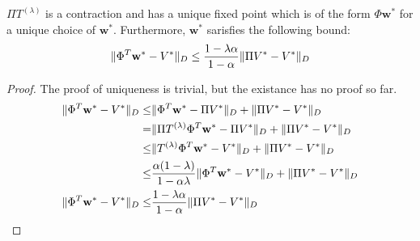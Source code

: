 \begin{lem}
    $ \Pi T^{(\lambda)} $ is a contraction and has a unique fixed point which is of the form $ \Phi \mathbf{w}^* $ 
    for a unique choice of $ \mathbf{w}^* $. Furthermore, $ \mathbf{w}^* $ sarisfies the following bound:
    \[
        \Arrowvert \Phi^T \mathbf{w}^* - V^* \Arrowvert_D
        \le \frac{1-\lambda \alpha}{1-\alpha} \Arrowvert \Pi V^* - V^* \Arrowvert_D
    \]
    \begin{proof}
        The proof of uniqueness is trivial, but the existance has no proof so far.
       \begin{equation}
           \begin{aligned}
               \Arrowvert \Phi^T \mathbf{w}^* - V^* \Arrowvert_D
               \le& \Arrowvert \Phi^T \mathbf{w}^* - \Pi V^* \Arrowvert_D 
               + \Arrowvert \Pi V^* - V^* \Arrowvert_D \\
               =& \Arrowvert \Pi T^{(\lambda)}\Phi^T \mathbf{w}^* - \Pi V^* \Arrowvert_D 
               + \Arrowvert \Pi V^* - V^* \Arrowvert_D \\
               \le& \Arrowvert T^{(\lambda)}\Phi^T \mathbf{w}^* - V^* \Arrowvert_D 
               + \Arrowvert \Pi V^* - V^* \Arrowvert_D \\
               \le& \frac{\alpha(1-\lambda)}{1-\alpha\lambda} \Arrowvert \Phi^T \mathbf{w}^* - V^* \Arrowvert_D
               + \Arrowvert \Pi V^* - V^* \Arrowvert_D\\
               \Arrowvert \Phi^T \mathbf{w}^* - V^* \Arrowvert_D 
               \le& \frac{1-\lambda\alpha}{1-\alpha} \Arrowvert \Pi V^* - V^* \Arrowvert_D
           \end{aligned}
       \end{equation} 
    \end{proof}
\end{lem}

